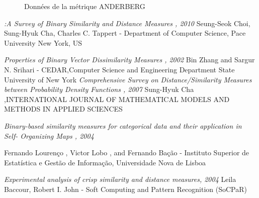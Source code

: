 \documentclass[a4paper, 12pt]{book}
\begin{document}
\begin{figure}[!h] 	
    \caption{Données de la métrique ANDERBERG}
\end{figure}


\begin{thebibliography}{2}
     {\it :A Survey of Binary Similarity and Distance Measures , 2010} 
    Seung-Seok Choi, Sung-Hyuk Cha, Charles C. Tappert - Department of Computer Science, Pace University 
New York, US 

       {\it Properties of Binary Vector Dissimilarity Measures , 2002}  
    Bin Zhang and Sargur N. Srihari - CEDAR,Computer Science and Engineering Department State University of New York
     {\it Comprehensive Survey on Distance/Similarity Measures between Probability Density 
Functions  , 2007} 
    Sung-Hyuk Cha ,INTERNATIONAL JOURNAL OF MATHEMATICAL MODELS AND METHODS IN APPLIED SCIENCES

     {\it Binary-based similarity measures for categorical data and their application in Self-
Organizing Maps  , 2004} 

   Fernando Lourenço , Victor Lobo , and Fernando Bação - Instituto Superior de Estatística e Gestão de Informação, Universidade Nova de Lisboa 

     {\it Experimental analysis of crisp similarity and distance measures, 2004}
    Leila Baccour, Robert I. John - Soft Computing and Pattern Recognition (SoCPaR)

 
\end{thebibliography} 
\end{document}
